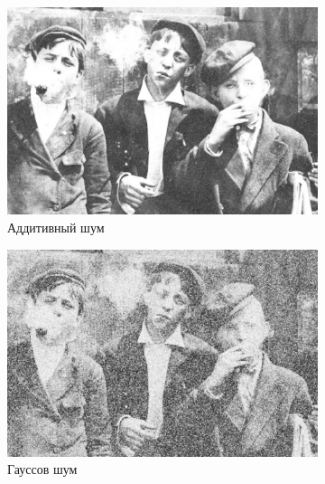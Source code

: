 \begin{figure}[ht!]
\begin{subfigure}[b]{0.5\linewidth}
      \includegraphics[width=0.95\linewidth]{../Contraharmonic_Filter/Contraharmonic_Additive_noise_(m,n=(3,_3),q=1.85).jpg} 
      \caption{Аддитивный шум} 
      \label{contraharmonic_1.85:c} 
      \vspace{4ex}
    \end{subfigure}%
    \begin{subfigure}[b]{0.5\linewidth}
      \centering
      \includegraphics[width=0.95\linewidth]{../Contraharmonic_Filter/Contraharmonic_Gaussian_noise_(m,n=(3,_3),q=1.85).jpg} 
      \caption{Гауссов шум} 
      \label{contraharmonic_1.85:d} 
      \vspace{4ex}
    \end{subfigure}
    \begin{subfigure}[b]{0.5\linewidth}
      \centering

\end{subfigure}
\end{figure}
